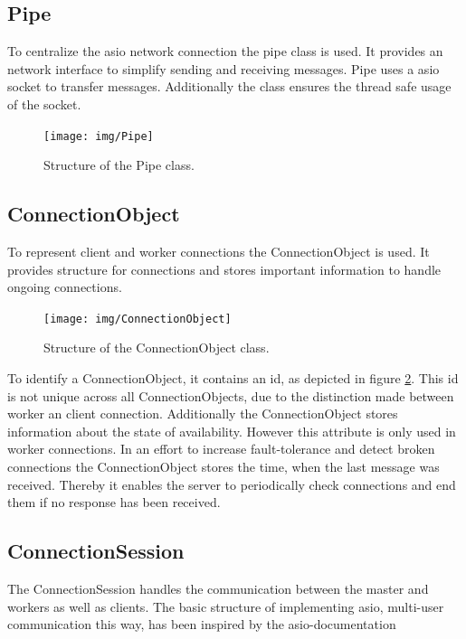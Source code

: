 \documentclass[12pt, letterpaper]{article}
\begin{document}
\subsection{Pipe}

To centralize the asio network connection the pipe class is used. It provides an network interface to simplify sending and receiving messages. Pipe uses a asio socket to transfer messages. Additionally the class ensures the thread safe usage of the socket. 

\begin{figure}[h]
	\centering
	\texttt{[image: img/Pipe]}
	\caption{Structure of the Pipe class.}
	\label{fig:classes_Pipe}
\end{figure}

\subsection{ConnectionObject}

To represent client and worker connections the ConnectionObject is used. It provides structure for connections and stores important information to handle ongoing connections. 

\begin{figure}[h]
	\centering
	\texttt{[image: img/ConnectionObject]}
	\caption{Structure of the ConnectionObject class.}
	\label{fig:classes_ConnectionObject}
\end{figure}

To identify a ConnectionObject, it contains an id, as depicted in figure \ref{fig:classes_ConnectionObject}. This id is not unique across all ConnectionObjects, due to the distinction made between worker an client connection. Additionally the ConnectionObject stores information about the state of availability. However this attribute is only used in worker connections.\newline
In an effort to increase fault-tolerance and detect broken connections the ConnectionObject stores the time, when the last message was received. Thereby it enables the server to periodically check connections and end them if no response has been received.

\subsection{ConnectionSession}

The ConnectionSession handles the communication between the master and workers as well as clients.
The basic structure of implementing asio, multi-user communication this way, has been inspired by the asio-documentation
\end{document}
